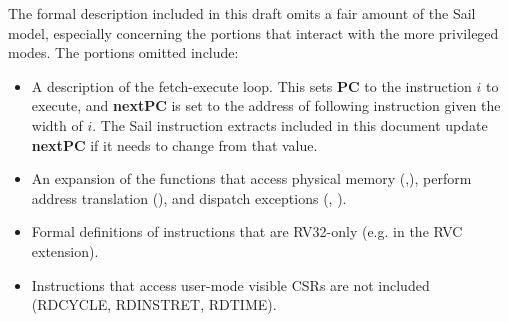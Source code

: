
The formal description included in this draft omits a fair amount of
the Sail model, especially concerning the portions that interact with
the more privileged modes.  The portions omitted include:

\begin{itemize}
\item A description of the fetch-execute loop.  This sets \textbf{PC}
  to the instruction $i$ to execute, and \textbf{nextPC} is set to the
  address of following instruction given the width of $i$.  The Sail
  instruction extracts included in this document update
  \textbf{nextPC} if it needs to change from that value.
\item An expansion of the functions that access physical memory
  (,), perform address
  translation (), and dispatch exceptions
  (, ).
\item Formal definitions of instructions that are RV32-only (e.g. in
  the RVC extension).
\item Instructions that access user-mode visible CSRs are not included
  (RDCYCLE, RDINSTRET, RDTIME).
\end{itemize}
